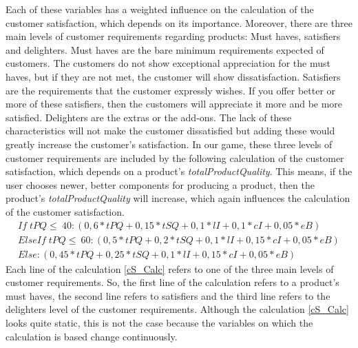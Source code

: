 Each of these variables has a weighted influence on the calculation of the customer satisfaction, which depends on its importance.
Moreover, there are three main levels of customer requirements regarding products: Must haves, satisfiers and delighters. \cite{krienke_messung_2009}
Must haves are the bare minimum requirements expected of customers. The customers do not show exceptional appreciation for the must haves, but if they are not met, the customer will show dissatisfaction. Satisfiers are the requirements that the customer expressly wishes. If you offer better or more of these satisfiers, then the customers will appreciate it more and be more satisfied. Delighters are the extras or the add-ons. The lack of these characteristics will not make the customer dissatisfied but adding these would greatly increase the customer's satisfaction. In our game, these three levels of customer requirements are included by the following calculation of the customer satisfaction, which depends on a product's \textit{totalProductQuality}. This means, if the user chooses newer, better components for producing a product, then the product's \textit{totalProductQuality} will increase, which again influences the calculation of the customer satisfaction.
    \begin{equation}
    \label{cS_Calc}
    \begin{aligned}
    If \; tPQ \leq \ 40: (0,6*tPQ + 0,15*tSQ + 0,1*lI + 0,1*cI + 0,05*eB)\\
    ElseIf \; tPQ \leq \ 60: (0,5*tPQ + 0,2*tSQ + 0,1*lI + 0,15*cI + 0,05*eB)\\
    Else: (0,45*tPQ + 0,25*tSQ + 0,1*lI + 0,15*cI + 0,05*eB)
    \end{aligned}
    \end{equation}
Each line of the calculation \ref{cS_Calc} refers to one of the three main levels of customer requirements. So, the first line of the calculation refers to a product's must haves, the second line refers to satisfiers and the third line refers to the delighters level of the customer requirements.
Although the calculation \ref{cS_Calc} looks quite static, this is not the case because the variables on which the calculation is based change continuously.
    
